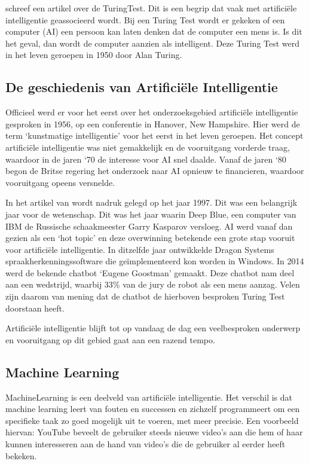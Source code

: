 \textcite{Kraaijvanger2012} schreef een artikel over de \gls{TuringTest}. Dit is een begrip dat vaak met artificiële intelligentie geassocieerd wordt. Bij een Turing Test wordt er gekeken of een computer (AI) een persoon kan laten denken dat de computer een mens is. Is dit het geval, dan wordt de computer aanzien als intelligent. Deze Turing Test werd in het leven geroepen in 1950 door Alan Turing. 

\subsection{De geschiedenis van Artificiële Intelligentie}
\label{sec:artificiëleintelligentiegeschiedenis}

Officieel werd er voor het eerst over het onderzoeksgebied artificiële intelligentie gesproken in 1956, op een conferentie in Hanover, New Hampshire. Hier werd de term ‘kunstmatige intelligentie’ voor het eerst in het leven geroepen. Het concept artificiële intelligentie was niet gemakkelijk en de vooruitgang vorderde traag, waardoor in de jaren ‘70 de interesse voor AI snel daalde. Vanaf de jaren ‘80 begon de Britse regering het onderzoek naar AI opnieuw te financieren, waardoor vooruitgang opeens versnelde. \autocite{Anyoha2017}

In het artikel van \textcite{Anyoha2017} wordt nadruk gelegd op het jaar 1997. Dit was een belangrijk jaar voor de wetenschap. Dit was het jaar waarin Deep Blue, een computer van IBM de Russische schaakmeester Garry Kasparov versloeg. AI werd vanaf dan gezien als een ‘hot topic’ en deze overwinning betekende een grote stap vooruit voor artificiële intelligentie. In ditzelfde jaar ontwikkelde Dragon Systems spraakherkenningssoftware die geïmplementeerd kon worden in Windows. 
In 2014 werd de bekende chatbot ‘Eugene Goostman’ gemaakt. Deze chatbot nam deel aan een wedstrijd, waarbij 33\% van de jury de robot als een mens aanzag. Velen zijn daarom van mening dat de chatbot de hierboven besproken Turing Test doorstaan heeft. \autocite{Anyoha2017}
 
Artificiële intelligentie blijft tot op vandaag de dag een veelbesproken onderwerp en vooruitgang op dit gebied gaat aan een razend tempo. 

\subsection{Machine Learning}
\label{sec:machinelearning}
\gls{MachineLearning} is een deelveld van artificiële intelligentie. Het verschil is dat machine learning leert van fouten en successen en zichzelf programmeert om een specifieke taak zo goed mogelijk uit te voeren, met meer precisie. Een voorbeeld hiervan: YouTube beveelt de gebruiker steeds nieuwe video’s aan die hem of haar kunnen interesseren aan de hand van video’s die de gebruiker al eerder heeft bekeken. \autocite{IBM2021}

